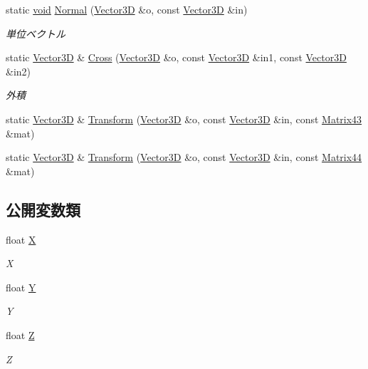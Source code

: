 \begin{DoxyCompactItemize}
static \mbox{\hyperlink{namespace_effekseer_ab34c4088e512200cf4c2716f168deb56}{void}} \mbox{\hyperlink{struct_effekseer_1_1_vector3_d_ad798a45142e315748ff769ff6b0157f3}{Normal}} (\mbox{\hyperlink{struct_effekseer_1_1_vector3_d}{Vector3D}} \&o, const \mbox{\hyperlink{struct_effekseer_1_1_vector3_d}{Vector3D}} \&in)
\begin{DoxyCompactList}\small\item\em 単位ベクトル \end{DoxyCompactList}\item 
static \mbox{\hyperlink{struct_effekseer_1_1_vector3_d}{Vector3D}} \& \mbox{\hyperlink{struct_effekseer_1_1_vector3_d_a6af90fb7357d8ab977fd647f3bfd5c52}{Cross}} (\mbox{\hyperlink{struct_effekseer_1_1_vector3_d}{Vector3D}} \&o, const \mbox{\hyperlink{struct_effekseer_1_1_vector3_d}{Vector3D}} \&in1, const \mbox{\hyperlink{struct_effekseer_1_1_vector3_d}{Vector3D}} \&in2)
\begin{DoxyCompactList}\small\item\em 外積 \end{DoxyCompactList}\item 
static \mbox{\hyperlink{struct_effekseer_1_1_vector3_d}{Vector3D}} \& \mbox{\hyperlink{struct_effekseer_1_1_vector3_d_ae46e69eb77703cd01dc860d5024cec7d}{Transform}} (\mbox{\hyperlink{struct_effekseer_1_1_vector3_d}{Vector3D}} \&o, const \mbox{\hyperlink{struct_effekseer_1_1_vector3_d}{Vector3D}} \&in, const \mbox{\hyperlink{struct_effekseer_1_1_matrix43}{Matrix43}} \&mat)
\item 
static \mbox{\hyperlink{struct_effekseer_1_1_vector3_d}{Vector3D}} \& \mbox{\hyperlink{struct_effekseer_1_1_vector3_d_a036e8dd4bdd50963f889f6c885440e06}{Transform}} (\mbox{\hyperlink{struct_effekseer_1_1_vector3_d}{Vector3D}} \&o, const \mbox{\hyperlink{struct_effekseer_1_1_vector3_d}{Vector3D}} \&in, const \mbox{\hyperlink{struct_effekseer_1_1_matrix44}{Matrix44}} \&mat)
\end{DoxyCompactItemize}
\subsection*{公開変数類}
\begin{DoxyCompactItemize}
\item 
float \mbox{\hyperlink{struct_effekseer_1_1_vector3_d_a72ca019b959303fd6b5a685634a5ab24}{X}}
\begin{DoxyCompactList}\small\item\em X \end{DoxyCompactList}\item 
float \mbox{\hyperlink{struct_effekseer_1_1_vector3_d_a93a6252ad3d33b83eac5f088ed51c114}{Y}}
\begin{DoxyCompactList}\small\item\em Y \end{DoxyCompactList}\item 
float \mbox{\hyperlink{struct_effekseer_1_1_vector3_d_aa73821e922d235f82cfb3d8eab43901a}{Z}}
\begin{DoxyCompactList}\small\item\em Z \end{DoxyCompactList}\end{DoxyCompactItemize}


